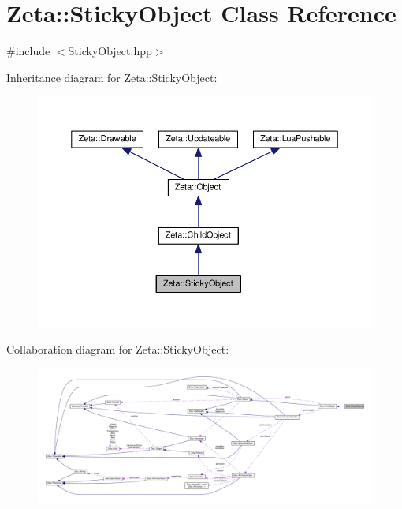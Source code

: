 \hypertarget{classZeta_1_1StickyObject}{\section{Zeta\+:\+:Sticky\+Object Class Reference}
\label{classZeta_1_1StickyObject}
}


{\ttfamily \#include $<$Sticky\+Object.\+hpp$>$}



Inheritance diagram for Zeta\+:\+:Sticky\+Object\+:\nopagebreak
\begin{figure}[H]
\begin{center}
\leavevmode
\includegraphics[width=350pt]{classZeta_1_1StickyObject__inherit__graph}
\end{center}
\end{figure}


Collaboration diagram for Zeta\+:\+:Sticky\+Object\+:
\nopagebreak
\begin{figure}[H]
\begin{center}
\leavevmode
\includegraphics[width=350pt]{classZeta_1_1StickyObject__coll__graph}
\end{center}
\end{figure}
